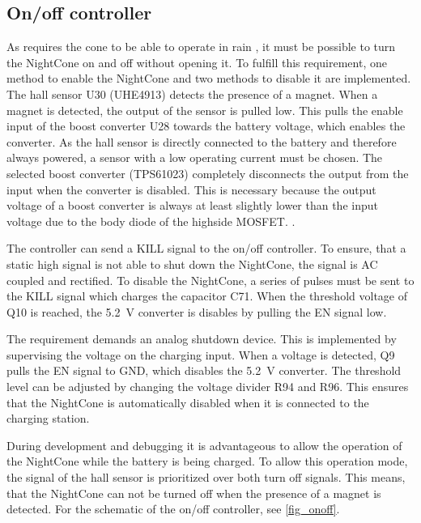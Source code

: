 \FloatBarrier

\subsection{On/off controller}
\label{sec_onoff}

As  requires the cone to be able to operate in rain , it must be possible to turn the NightCone on and off without opening it. To fulfill this requirement, one method to enable the NightCone and two methods to disable it are implemented. The hall sensor U30 (UHE4913) detects the presence of a magnet. When a magnet is detected, the output of the sensor is pulled low. This pulls the enable input of the boost converter U28 towards the battery voltage, which enables the converter. As the hall sensor is directly connected to the battery and therefore always powered, a sensor with a low operating current must be chosen. The selected boost converter (TPS61023) completely disconnects the output from the input when the converter is disabled. This is necessary because the output voltage of a boost converter is always at least slightly lower than the input voltage due to the body diode of the highside \ac{MOSFET}. \cite{TI:TPS61023}. 

The controller can send a KILL signal to the on/off controller. To ensure, that a static high signal is not able to shut down the NightCone, the signal is AC coupled and rectified. To disable the NightCone, a series of pulses must be sent to the KILL signal which charges the capacitor C71. When the threshold voltage of Q10 is reached, the \qty{5.2}{\volt} converter is disables by pulling the EN signal low. 

The requirement  demands an analog shutdown device. This is implemented by supervising the voltage on the charging input. When a voltage is detected, Q9 pulls the EN signal to GND, which disables the \qty{5.2}{\volt} converter. The threshold level can be adjusted by changing the voltage divider R94 and R96. This ensures that the NightCone is automatically disabled when it is connected to the charging station. 

During development and debugging it is advantageous to allow the operation of the NightCone while the battery is being charged. To allow this operation mode, the signal of the hall sensor is prioritized over both turn off signals. This means, that the NightCone can not be turned off when the presence of a magnet is detected. For the schematic of the on/off controller, see \autoref{fig_onoff}. 

